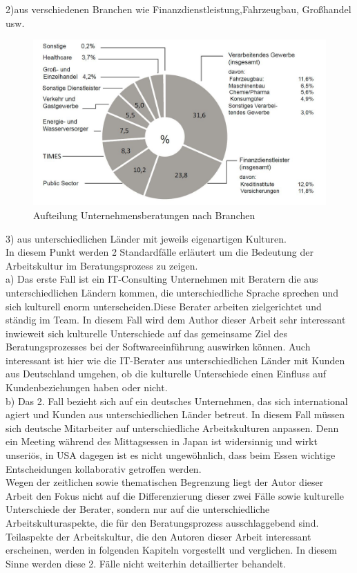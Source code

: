 2)aus verschiedenen Branchen wie Finanzdienstleistung,Fahrzeugbau, Großhandel usw.
\begin{figure}[htp]
\centering
\includegraphics[width=10 cm]{./images/Auft_U_Beratung}
\caption{Aufteilung Unternehmensberatungen nach Branchen}
\label{fig:AufteilungUnternehmensberatung}
\end{figure}

3) aus unterschiedlichen Länder mit jeweils eigenartigen Kulturen.\\
 In diesem Punkt werden 2 Standardfälle erläutert um die Bedeutung der Arbeitskultur im Beratungsprozess zu zeigen.\\
 a) Das erste Fall ist ein IT-Consulting Unternehmen mit Beratern die aus unterschiedlichen Ländern kommen, die unterschiedliche Sprache sprechen und sich kulturell enorm unterscheiden.Diese Berater arbeiten zielgerichtet und ständig im Team. In diesem Fall wird dem Author dieser Arbeit sehr interessant inwieweit sich kulturelle Unterschiede auf das gemeinsame Ziel des Beratungsprozesses bei der Softwareeinführung auswirken können. Auch interessant ist hier wie die IT-Berater aus unterschiedlichen Länder mit Kunden aus Deutschland umgehen, ob die kulturelle Unterschiede einen Einfluss auf Kundenbeziehungen haben oder nicht. \\
 b) Das 2. Fall bezieht sich auf ein deutsches Unternehmen, das sich international agiert und Kunden aus unterschiedlichen Länder betreut. In diesem Fall müssen sich deutsche Mitarbeiter auf unterschiedliche Arbeitskulturen anpassen. Denn ein Meeting während des Mittagsessen in Japan ist widersinnig und wirkt unseriös, in USA dagegen ist es nicht ungewöhnlich, dass beim Essen wichtige Entscheidungen kollaborativ getroffen werden.  \\
Wegen der zeitlichen sowie thematischen Begrenzung liegt der Autor dieser Arbeit den Fokus nicht auf die Differenzierung dieser zwei Fälle sowie kulturelle Unterschiede der Berater, sondern nur auf die unterschiedliche Arbeitskulturaspekte, die für den Beratungsprozess ausschlaggebend sind. Teilaspekte der Arbeitskultur, die den Autoren dieser Arbeit interessant erscheinen, werden in folgenden Kapiteln vorgestellt und verglichen. In diesem Sinne werden diese 2. Fälle nicht weiterhin detaillierter behandelt.

